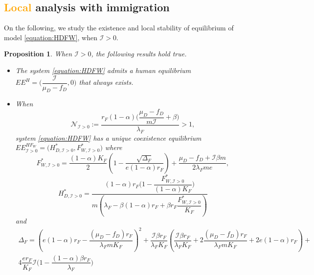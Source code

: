 \documentclass{article}
\newcommand{\lfw}{\lambda_{F}}
\newcommand{\lfw}{\lambda_{F}}
\newcommand{\cI}{\mathcal{I}}
\newcommand{\vdeux}[1]{\textcolor{orange}{#1}}
\newtheorem{prop}[theorem]{Proposition}
\theoremstyle{definition}
\theoremstyle{remark}
\newtheorem{remark}[theorem]{Remark}
\begin{document}
\subsection{\vdeux{Local} analysis with immigration}
On the following, we study the existence and local stability of equilibrium of model \eqref{equation:HDFW}, when $\cI > 0$.

\begin{prop}\label{prop:eq, cI>0}
When $\cI > 0$, the following results hold true.
\begin{itemize}
\item The system \eqref{equation:HDFW} admits a human equilibrium $EE^{H} =\Big(\dfrac{\cI}{\mu_D - f_D}, 0 \Big)$ that always exists.
\item When 
$$ \mathcal{N}_{\cI >0} :=  \dfrac{r_F(1-\alpha)\Big({\dfrac{\mu_D - f_D}{m\cI}+\beta\Big)}}{\lfw}  > 1,$$
system \eqref{equation:HDFW} has a unique coexistence equilibrium $EE^{HF_W}_{\cI > 0} = \Big(H^*_{D, \cI > 0}, F^*_{W, \cI > 0}\Big)$
where
$$F^*_{W, \cI > 0} = \dfrac{(1-\alpha)K_F}{2}\left(1 - \dfrac{\sqrt{\Delta_F}}{e(1-\alpha)r_F}\right) + \dfrac{\mu_D - f_D + \cI \beta m}{2\lfw m e},$$
$$
H^*_{D, \cI > 0} = \dfrac{(1-\alpha)r_F\Big(1 - \dfrac{F^*_{W, \cI > 0}}{(1-\alpha)K_F} \Big)}{m\left(\lfw - \beta (1-\alpha) r_F + \beta r_F  \dfrac{F^*_{W, \cI > 0}}{K_F}\right)}
$$
and
\begin{multline*}
\Delta_F = \left(e(1-\alpha)r_F - \dfrac{(\mu_D - f_D) r_F}{\lfw m K_F}\right)^2 + \dfrac{\cI \beta r_F}{\lfw K_F} \left(\dfrac{\cI \beta r_F}{\lfw K_F} + 2\dfrac{(\mu_D - f_D) r_F}{\lfw m K_F} + 2e(1-\alpha)r_F \right) + \\ 4\dfrac{er_F}{K_F}  \cI\Big(1 - \dfrac{(1-\alpha)\beta r_F}{\lfw} \Big)
\end{multline*}
\end{itemize} 
\end{prop}
\end{document}
